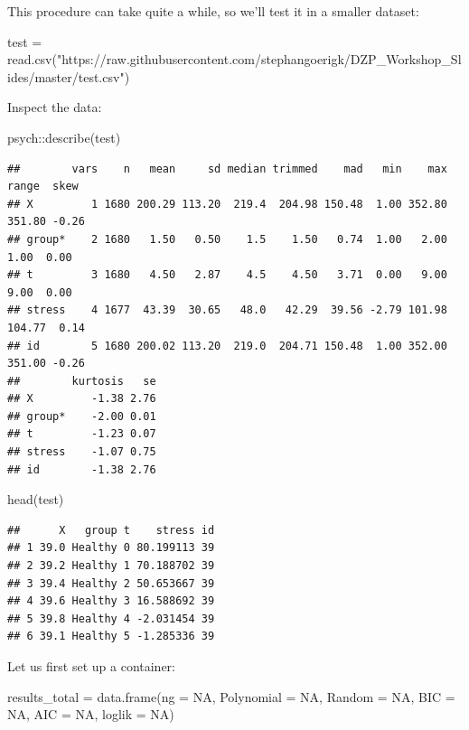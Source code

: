 \documentclass[
]{book}
\newenvironment{Shaded}{\begin{snugshade}}{\end{snugshade}}
\newcommand{\AttributeTok}[1]{\textcolor[rgb]{0.77,0.63,0.00}{#1}}
\newcommand{\ConstantTok}[1]{\textcolor[rgb]{0.00,0.00,0.00}{#1}}
\newcommand{\FunctionTok}[1]{\textcolor[rgb]{0.00,0.00,0.00}{#1}}
\newcommand{\NormalTok}[1]{#1}
\newcommand{\OtherTok}[1]{\textcolor[rgb]{0.56,0.35,0.01}{#1}}
\newcommand{\SpecialCharTok}[1]{\textcolor[rgb]{0.00,0.00,0.00}{#1}}
\newcommand{\StringTok}[1]{\textcolor[rgb]{0.31,0.60,0.02}{#1}}
\begin{document}
This procedure can take quite a while, so we'll test it in a smaller dataset:

\begin{Shaded}
\begin{Highlighting}[]
\NormalTok{test }\OtherTok{=} \FunctionTok{read.csv}\NormalTok{(}\StringTok{"https://raw.githubusercontent.com/stephangoerigk/DZP\_Workshop\_Slides/master/test.csv"}\NormalTok{)}
\end{Highlighting}
\end{Shaded}

Inspect the data:

\begin{Shaded}
\begin{Highlighting}[]
\NormalTok{psych}\SpecialCharTok{::}\FunctionTok{describe}\NormalTok{(test)}
\end{Highlighting}
\end{Shaded}

\begin{verbatim}
##        vars    n   mean     sd median trimmed    mad   min    max  range  skew
## X         1 1680 200.29 113.20  219.4  204.98 150.48  1.00 352.80 351.80 -0.26
## group*    2 1680   1.50   0.50    1.5    1.50   0.74  1.00   2.00   1.00  0.00
## t         3 1680   4.50   2.87    4.5    4.50   3.71  0.00   9.00   9.00  0.00
## stress    4 1677  43.39  30.65   48.0   42.29  39.56 -2.79 101.98 104.77  0.14
## id        5 1680 200.02 113.20  219.0  204.71 150.48  1.00 352.00 351.00 -0.26
##        kurtosis   se
## X         -1.38 2.76
## group*    -2.00 0.01
## t         -1.23 0.07
## stress    -1.07 0.75
## id        -1.38 2.76
\end{verbatim}

\begin{Shaded}
\begin{Highlighting}[]
\FunctionTok{head}\NormalTok{(test)}
\end{Highlighting}
\end{Shaded}

\begin{verbatim}
##      X   group t    stress id
## 1 39.0 Healthy 0 80.199113 39
## 2 39.2 Healthy 1 70.188702 39
## 3 39.4 Healthy 2 50.653667 39
## 4 39.6 Healthy 3 16.588692 39
## 5 39.8 Healthy 4 -2.031454 39
## 6 39.1 Healthy 5 -1.285336 39
\end{verbatim}

Let us first set up a container:

\begin{Shaded}
\begin{Highlighting}[]
\NormalTok{results\_total }\OtherTok{=} \FunctionTok{data.frame}\NormalTok{(}\AttributeTok{ng =} \ConstantTok{NA}\NormalTok{,}
                           \AttributeTok{Polynomial =} \ConstantTok{NA}\NormalTok{,}
                           \AttributeTok{Random =} \ConstantTok{NA}\NormalTok{,}
                           \AttributeTok{BIC =} \ConstantTok{NA}\NormalTok{,}
                           \AttributeTok{AIC =} \ConstantTok{NA}\NormalTok{,}
                           \AttributeTok{loglik =} \ConstantTok{NA}\NormalTok{)}
\end{Highlighting}
\end{Shaded}
\end{document}
